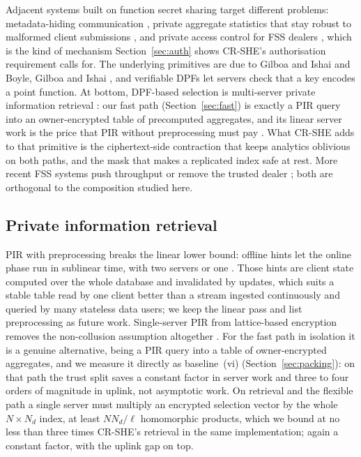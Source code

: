 \documentclass[a4paper,fleqn]{cas-sc}
\begin{document}
Adjacent systems built on function secret sharing target different problems:
metadata-hiding communication \citep{express}, private aggregate statistics
that stay robust to malformed client submissions
\citep{corrigan2017prio,boneh2021lightweight}, and private access control for
FSS dealers \citep{pacl}, which is the kind of mechanism
Section~\ref{sec:auth} shows CR-SHE's authorisation requirement calls for. The
underlying primitives are due to Gilboa and Ishai
\citep{gilboa2014distributed} and Boyle, Gilboa and Ishai
\citep{boyle2015function,boyle2016function}, and verifiable DPFs
\citep{decastro2022lightweight} let servers check that a key encodes a point
function. At bottom, DPF-based selection is multi-server private information
retrieval \citep{chor1998private}: our fast path (Section~\ref{sec:fast}) is
exactly a PIR query into an owner-encrypted table of precomputed aggregates,
and its linear server work is the price that PIR without preprocessing must
pay \citep{beimel2000reducing}. What CR-SHE adds to that primitive is the
ciphertext-side contraction that keeps analytics oblivious on both paths,
and the mask that makes a replicated index safe at rest. More recent FSS
systems push throughput \citep{storrier2023grotto} or remove the trusted
dealer \citep{doerner2017scaling}; both are orthogonal to the composition
studied here.

\subsection{Private information retrieval}
PIR with preprocessing breaks the linear lower bound: offline hints let the
online phase run in sublinear time, with two servers
\citep{corrigan2020private} or one \citep{corrigan2022single,zhou2024piano}.
Those hints are client state computed over the whole database and invalidated
by updates, which suits a stable table read by one client better than a stream
ingested continuously and queried by many stateless data users; we keep the
linear pass and list preprocessing as future work. Single-server PIR from
lattice-based encryption
\citep{angel2018pir,mughees2021onionpir,menon2022spiral,davidson2023frodopir}
removes the non-collusion assumption altogether
\citep{kushilevitz1997replication}. For the fast path in isolation it is a
genuine alternative, being a PIR query into a table of owner-encrypted
aggregates, and we measure it directly as baseline~(vi)
(Section~\ref{sec:packing}): on that path the trust split saves a constant
factor in server work and three to four orders of magnitude in uplink, not
asymptotic work. On retrieval and the flexible path a single server must
multiply an encrypted selection vector by the whole $N\times N_d$ index, at
least $NN_d/\ell$ homomorphic products, which we bound at no less than three
times CR-SHE's retrieval in the same implementation; again a constant factor,
with the uplink gap on top.
\end{document}

